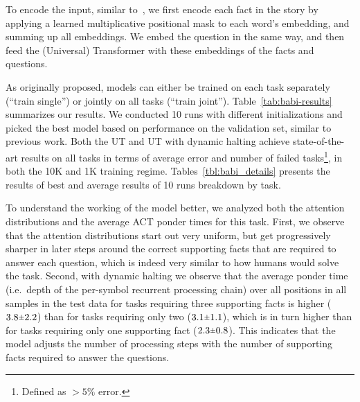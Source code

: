 To encode the input, similar to~\cite{henaff2016tracking}, we first encode each fact in the story by applying a learned multiplicative positional mask to each word's embedding, and summing up all embeddings.
We embed the question in the same way, and then feed the (Universal) Transformer with these embeddings of the facts and questions. 

As originally proposed, models can either be trained on each task separately (``train single'') or jointly on all tasks (``train joint''). Table~\ref{tab:babi-results} summarizes our results. We conducted 10 runs with different initializations and picked the best model based on performance on the validation set, similar to previous work. Both the UT and UT with dynamic halting achieve state-of-the-art results on all tasks in terms of average error and number of failed tasks\footnote{Defined as $> 5\%$ error.}, in both the 10K and 1K training regime. Tables~\ref{tbl:babi_details} presents the results of best and average results of 10 runs breakdown by task.





To understand the working of the model better, we analyzed both the attention distributions and the average ACT ponder times for this task. First, we observe that the attention distributions start out very uniform, but get progressively sharper in later steps around the correct supporting facts that are required to answer each question, which is indeed very similar to how humans would solve the task. 
%
Second, with dynamic halting we observe that the average ponder time (i.e.\ depth of the per-symbol recurrent processing chain) over all positions in all samples in the test data for tasks requiring three supporting facts is higher ($3.8 \rpm 2.2$) than for tasks requiring only two ($3.1 \rpm 1.1$), which is in turn higher than for tasks requiring only one supporting fact ($2.3 \rpm 0.8$). This indicates that the model adjusts the number of processing steps with the number of supporting facts required to answer the questions. 

